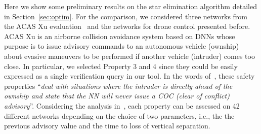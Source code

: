 Here we show some preliminary results on the star elimination algorithm detailed in
Section~\ref{sec:optim}. For the comparison, we considered three networks from the 
ACAS Xu evaluation~\cite{DBLP:conf/cav/KatzBDJK17} and the networks for drone control
presented before. ACAS Xu is an airborne collision avoidance system based on DNNs 
whose purpose is to issue advisory commands to an autonomous vehicle (ownship) about
evasive maneuvers to be performed if another vehicle (intruder) comes too close. 
In particular, we selected Property 3 and 4 since they could be easily expressed as
a single verification query in our tool.
In the words of~\cite{DBLP:conf/cav/KatzBDJK17}, these safety properties 
``\textit{deal with situations where the intruder is directly ahead of the ownship 
	and state that the NN will never issue a COC (clear of conflict) advisory}''.
Considering the analysis in~\cite{DBLP:conf/cav/KatzBDJK17}, each property can be
assessed on 42 different networks depending on the choice of two parameters, i.e.,
the the previous advisory value and the time to loss of vertical separation.

